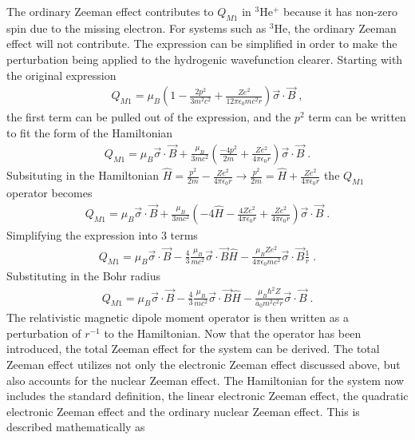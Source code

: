             The ordinary Zeeman effect contributes to $Q_{M1}$ in $^3$He$^+$ because it has non-zero spin due to the missing electron. For systems such as $^3$He, the ordinary Zeeman effect will not contribute. The expression can be simplified in order to make the perturbation being applied to the hydrogenic wavefunction clearer. Starting with the original expression 
            \begin{align}
                Q_{M1} = \mu_B\left( 1 - \frac{2p^2}{3m^2c^2} + \frac{Ze^2}{12\pi \epsilon_0 mc^2 r} \right) \vec{\sigma} \cdot \vec{B}\;,
            \end{align}
            \noindent the first term can be pulled out of the expression, and the $p^2$ term can be written to fit the form of the Hamiltonian 
            \begin{align}
                Q_{M1} = \mu_B \vec{\sigma} \cdot \vec{B} + \frac{\mu_B}{3mc^2} \left( \frac{-4p^2}{2m} + \frac{Ze^2}{4\pi \epsilon_0 r} \right) \vec{\sigma} \cdot \vec{B}\;.
            \end{align}
            \noindent Subsituting in the Hamiltonian $\hat{H} = \frac{p^2}{2m} - \frac{Ze^2}{4\pi \epsilon_0 r} \longrightarrow \frac{p^2}{2m} = \hat{H} + \frac{Ze^2}{4\pi \epsilon_0 r}$ the $Q_{M1}$ operator becomes 
            \begin{align}
                Q_{M1} = \mu_B \vec{\sigma} \cdot \vec{B} + \frac{\mu_B}{3mc^2} \left( -4\hat{H} - \frac{4Ze^2}{4\pi \epsilon_0 r} + \frac{Ze^2}{4\pi \epsilon_0 r} \right) \vec{\sigma} \cdot \vec{B}\;.
            \end{align}
            \noindent Simplifying the expression into 3 terms 
            \begin{align}
                Q_{M1} = \mu_B \vec{\sigma} \cdot \vec{B} - \frac{4}{3}\frac{\mu_B}{mc^2}\vec{\sigma} \cdot \vec{B} \hat{H} - \frac{\mu_B Ze^2}{4\pi \epsilon_0 mc^2}\vec{\sigma} \cdot \vec{B} \frac{1}{r}\;.
            \end{align}
            \noindent Substituting in the Bohr radius 
            \begin{align}
                Q_{M1} = \mu_B \vec{\sigma} \cdot \vec{B} - \frac{4}{3}\frac{\mu_B}{mc^2}\vec{\sigma} \cdot \vec{B} \hat{H} - \frac{\mu_B \hbar^2 Z}{\bar{a}_0 m^2c^2r}\vec{\sigma} \cdot \vec{B} \;.
            \end{align}
            \noindent The relativistic magnetic dipole moment operator is then written as a perturbation of $r^{-1}$ to the Hamiltonian. Now that the operator has been introduced, the total Zeeman effect for the system can be derived. The total Zeeman effect utilizes not only the electronic Zeeman effect discussed above, but also accounts for the nuclear Zeeman effect. The Hamiltonian for the system now includes the standard definition, the linear electronic Zeeman effect, the quadratic electronic Zeeman effect and the ordinary nuclear Zeeman effect. This is described mathematically as 

